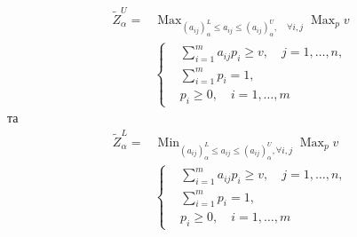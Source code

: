 \documentclass[14pt, a4paper, oneside]{extarticle}
\numberwithin{equation}{section}
\newcommand{\geqslant}{\geq}
\newcommand{\leqslant}{\leq}
\begin{document}
\begin{equation}
\begin{aligned}
\tilde{Z}_\alpha^U= & \operatorname{Max}_{\left(a_{i j}\right)_\alpha^L \leqslant a_{i j} \leqslant\left(a_{i j}\right)_\alpha^U, \quad \forall i, j} \operatorname{Max}_p v \\
& \left\{\begin{aligned}
&\sum_{i=1}^m a_{i j} p_i \geqslant v, \quad j=1, \ldots, n, \\
&\sum_{i=1}^m p_i=1, \\
&p_i \geqslant 0, \quad i=1, \ldots, m
\end{aligned}\right.
\end{aligned}
\end{equation}
та
\begin{equation}
\begin{aligned}
\tilde{Z}_\alpha^L= & \operatorname{Min}_{\left(a_{i j}\right)_\alpha^L \leqslant a_{i j} \leqslant\left(a_{i j}\right)_\alpha^U, \forall i, j} \operatorname{Max}_p v \\
& \left\{\begin{aligned}
&\sum_{i=1}^m a_{i j} p_i \geqslant v, \quad j=1, \ldots, n, \\
&\sum_{i=1}^m p_i=1, \\
&p_i \geqslant 0, \quad i=1, \ldots, m 
\end{aligned}\right.
\end{aligned}
\end{equation}
\end{document}
